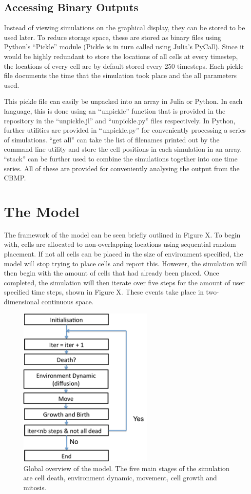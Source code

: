 \documentclass[12pt]{article}
\begin{document}
\subsection{Accessing Binary Outputs}
Instead of viewing simulations on the graphical display, they can be 
stored to be used later. To reduce storage space, these are stored as 
binary files using Python's ``Pickle'' module (Pickle is in turn called 
using Julia's PyCall). Since it would be highly redundant to store the 
locations of all cells at every timestep, the locations of every cell 
are by default stored every 250 timesteps. Each pickle file documents 
the time that the simulation took place and the all parameters used.

This pickle file can easily be unpacked into an array in Julia or 
Python. In each language, this is done using an ``unpickle'' function 
that is provided in the repository in the ``unpickle.jl'' and 
``unpickle.py'' files respectively. In Python, further utilities are 
provided in ``unpickle.py'' for conveniently processing a series of 
simulations. ``get all'' can take the list of filenames printed out by 
the command line utility and store the cell positions in each simulation 
in an array. ``stack'' can be further used to combine the simulations 
together into one time series. All of these are provided for 
conveniently analysing the output from the CBMP.

\section{The Model}
The framework of the model can be seen briefly outlined in Figure X. To 
begin with, cells are allocated to non-overlapping locations using 
sequential random placement. If not all cells can be placed in the size 
of environment specified, the model will stop trying to place cells and 
report this. However, the simulation will then begin with the amount of 
cells that had already been placed. Once completed, the simulation will 
then iterate over five steps for the amount of user specified time 
steps, shown in Figure X. These events take place in two-dimensional 
continuous space. 

\begin{figure}[H]
\centering
\includegraphics[width=6.71cm]{media/algorithmoverview.png}
\caption[]{Global overview of the model. The five main stages 
of the simulation are cell death, environment dynamic, movement, cell 
growth and mitosis.}
\end{figure}
\end{document}
